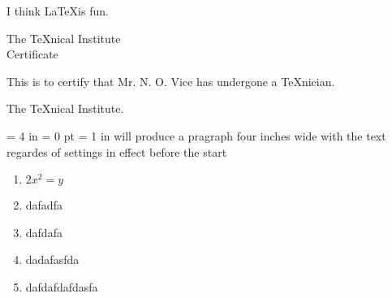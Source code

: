 \documentclass[fleqn]{jsarticle}
\begin{document}
I think \LaTeX is fun.
\begin{center}
  The \TeX nical Institute \\[.75cm] Certificate
\end{center}
\noindent This is to certify that Mr. N. O. Vice has undergone a \TeX nician.
\begin{flushright}
  The \TeX nical Institute.
\end{flushright}
  {
    \hsize = 4 in
    \parindent = 0 pt
    \leftskip = 1 in
    will produce a pragraph four inches wide with the text
    regardes of settings in effect before the start
    \par
  }
\begin{multicols}{2}
\begin{enumerate}
  \item $2x^2 =y$ \\
  \item dafadfa \\
  \item dafdafa
  \item dadafasfda\\
  \item dafdafdafdasfa \\
\end{enumerate}
\end{multicols}
\end{document}
